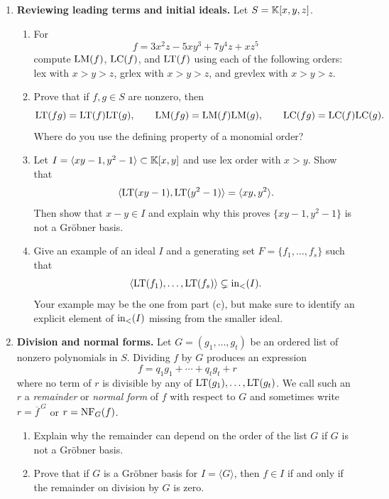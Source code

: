 \documentclass[Notebook.tex]{subfiles}
\begin{document}
\begin{enumerate}[leftmargin=*, series=problems]

\item \textbf{Reviewing leading terms and initial ideals.} Let $S=\mathbb K[x,y,z]$.
\begin{enumerate}[label=(\alph*),ref=\theenumi\alph*]
    \item For
    \[
    f=3x^2z-5xy^3+7y^4z+xz^5
    \]
    compute $\text{LM}(f)$, $\text{LC}(f)$, and $\text{LT}(f)$ using each of the following orders: lex with $x>y>z$, grlex with $x>y>z$, and grevlex with $x>y>z$.
    
    \item Prove that if $f,g\in S$ are nonzero, then
    \[
    \text{LT}(fg)=\text{LT}(f)\text{LT}(g), \qquad \text{LM}(fg)=\text{LM}(f)\text{LM}(g), \qquad \text{LC}(fg)=\text{LC}(f)\text{LC}(g).
    \]
    Where do you use the defining property of a monomial order?
    
    \item Let $I=\langle xy-1,y^2-1\rangle\subset \mathbb K[x,y]$ and use lex order with $x>y$. Show that
    \[
    \langle \text{LT}(xy-1),\text{LT}(y^2-1)\rangle=\langle xy,y^2\rangle.
    \]
    Then show that $x-y\in I$ and explain why this proves $\{xy-1,y^2-1\}$ is not a Gr\"obner basis.
    
    \item Give an example of an ideal $I$ and a generating set $F=\{f_1,\ldots,f_s\}$ such that
    \[
    \langle \text{LT}(f_1),\ldots,\text{LT}(f_s)\rangle \subsetneq \text{in}_<(I).
    \]
    Your example may be the one from part (c), but make sure to identify an explicit element of $\text{in}_<(I)$ missing from the smaller ideal.
\end{enumerate}

\item \textbf{Division and normal forms.} Let $G=(g_1,\ldots,g_t)$ be an ordered list of nonzero polynomials in $S$. Dividing $f$ by $G$ produces an expression
\[
    f=q_1g_1+\cdots+q_tg_t+r
\]
where no term of $r$ is divisible by any of $\text{LT}(g_1),\ldots,\text{LT}(g_t)$. We call such an $r$ a \emph{remainder} or \emph{normal form} of $f$ with respect to $G$ and sometimes write $r=\overline{f}^{\,G}$ or $r=\text{NF}_G(f)$.
\begin{enumerate}[label=(\alph*),ref=\theenumi\alph*]
    \item Explain why the remainder can depend on the order of the list $G$ if $G$ is not a Gr\"obner basis.
    
    \item Prove that if $G$ is a Gr\"obner basis for $I=\langle G\rangle$, then $f\in I$ if and only if the remainder on division by $G$ is zero.
    

\end{enumerate}
\end{enumerate}
\end{document}
